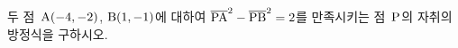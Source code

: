 두 점~$\mathrm{A}(-4{,}\mkern3mu\mathopen{}-2)$, $\mathrm{B}(1{,}\mkern3mu\mathopen{}-1)$에 대하여 $\overline{\mathrm{PA}}^2-\overline{\mathrm{PB}}^2=2$를 만족시키는 점~$\mathrm{P}$의 자취의 방정식을 구하시오.
